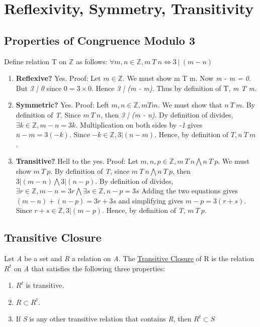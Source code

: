 \documentclass[12pt]{article}
\begin{document}
\section*{Reflexivity, Symmetry, Transitivity}
\subsection*{Properties of Congruence Modulo 3}
Define relation T on $ \mathbb{Z} $ as follows: $\forall m, n \in \mathbb{Z}, m \ T \ n \Leftrightarrow 3 \ | \ (m - n)$

\begin{enumerate}
\item \textbf{Reflexive?}
Yes. Proof: Let $m \in \mathbb{Z}$. We must show m T m. Now \textit{m - m = 0}. But \textit{3 | 0} since $0 = 3 \times 0$. Hence \textit{3 | (m - m)}. Thus by definition of T, \textit{m T m}.

\item \textbf{Symmetric?}
Yes. Proof: Left $m, n \in \mathbb{Z}, m T m$. We must show that $n \  T \ m$. By definition of \textit{T}. Since $m \ T \ n$, then \textit{3 | (m - n)}. Dy definition of divides, $\exists k \in \mathbb{Z}, m - n = 3k.$ Multiplication on both sides by \textit{-1} gives $n - m = 3(-k)$. Since $-k \in \mathbb{Z}, 3 | (n - m)$. Hence, by definition of $T, n \ T \ m$. 

\item \textbf{Transitive?}
Hell to the yes. Proof: Let $m, n, p \in \mathbb{Z}, m \ T \ n \bigwedge n \ T \ p $. We must show $m \ T \ p$. By definition of \textit{T}, since $ m \ T \ n \bigwedge n \ T \ p$, then $ 3 | (m - n) \bigwedge 3 | (n - p)$. By definition of divides, $\exists r \in \mathbb{Z}, m - n = 3r \bigwedge \exists s \in \mathbb{Z}, n - p = 3s$ Adding the two equations gives $(m - n) + (n - p) = 3r +3s$ and simplifying gives $m - p = 3(r+s)$. Since $r + s \in \mathbb{Z}, 3 | (m - p)$. Hence, by definition of \textit{T}, $m \ T \ p$.
\end{enumerate}

\subsection*{Transitive Closure}
Let \textit{A} be a set and \textit{R} a relation on \textit{A}. The \underline{Transitive Closure} of R is the relation $R^t$ on \textit{A} that satisfies the following three properties:

\begin{enumerate}
\item $R^t$ is transitive.
\item $R \subset R^{t}$.
\item If \textit{S} is any other transitive relation that contains \textit{R}, then $R^{t} \subset S$
\end{enumerate}
\end{document}
